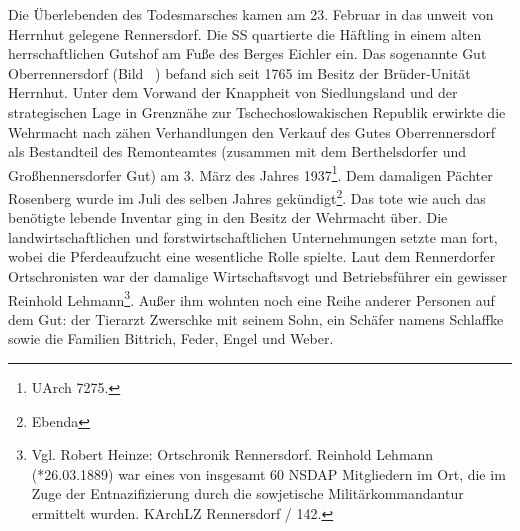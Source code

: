 \documentclass[a4paper,12pt,ngerman,
]{nisebook}
\begin{document}
Die Überlebenden des Todesmarsches kamen am 23. Februar in das unweit von Herrnhut gelegene Rennersdorf. Die SS quartierte die Häftling in einem alten herrschaftlichen Gutshof am Fuße des Berges Eichler ein.
Das sogenannte Gut Oberrennersdorf (Bild ~) befand sich seit 1765 im Besitz der Brüder-Unität Herrnhut.
Unter dem Vorwand der Knappheit von Siedlungsland und der strategischen Lage in Grenz\-nähe zur Tschechoslowakischen Republik erwirkte die Wehrmacht nach zähen Verhandlungen den Verkauf des Gutes Oberrennersdorf als Bestandteil des Remonteamtes (zusammen mit dem Berthelsdorfer und Großhennersdorfer Gut) am 3. März des Jahres 1937\footnote{UArch 7275.}. Dem damaligen Pächter Rosenberg wurde im Juli des selben Jahres gekündigt\footnote{Ebenda}. 
Das tote wie auch das benötigte lebende Inventar ging in den Besitz der Wehrmacht über. Die landwirtschaftlichen und forstwirtschaftlichen Unternehmungen setzte man fort, wobei die Pferdeaufzucht eine wesentliche Rolle spielte. 
Laut dem Rennerdorfer Ortschronisten war der damalige Wirtschaftsvogt und Betriebsführer ein gewisser Reinhold Lehmann\footnote{Vgl. Robert Heinze: Ortschronik Rennersdorf. Reinhold Lehmann (*26.03.1889) war eines von insgesamt 60 NSDAP Mitgliedern im Ort, die im Zuge der Entnazifizierung durch die sowjetische Militärkommandantur ermittelt wurden. KArchLZ Rennersdorf / 142. }. Außer ihm wohnten noch eine Reihe anderer Personen auf dem Gut: der Tierarzt Zwerschke mit seinem Sohn, ein Schäfer namens Schlaffke sowie die Familien Bittrich, Feder, Engel und Weber. 
\end{document}
